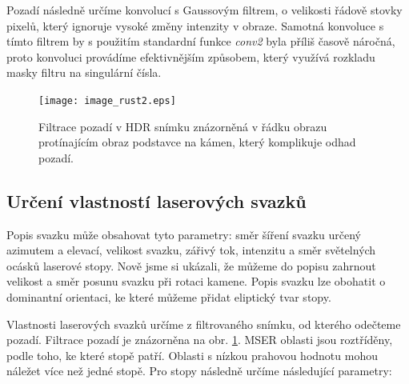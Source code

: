 	Pozadí následně určíme konvolucí s Gaussovým filtrem, o velikosti řádově stovky pixelů, který ignoruje vysoké změny intenzity v obraze. Samotná konvoluce s tímto filtrem by s použitím standardní funkce \textit{conv2} byla příliš časově náročná, proto konvoluci provádíme efektivnějším způsobem, který využívá rozkladu masky filtru na singulární čísla.
	
\begin{figure}[htbp]
    \centering\texttt{[image: image\_rust2.eps]}
     \caption[Filtrace pozadí.]{Filtrace pozadí v HDR snímku znázorněná v řádku obrazu protínajícím obraz podstavce na kámen, který komplikuje odhad pozadí.}
        \label{fig:pozadi}
\end{figure}
	       

\subsection*{Určení vlastností laserových svazků}
Popis svazku může obsahovat tyto parametry: směr šíření svazku určený azimutem a elevací, velikost svazku, zářivý tok, intenzitu a směr světelných ocásků laserové stopy. Nově jsme si ukázali, že můžeme do popisu zahrnout velikost a směr posunu svazku při rotaci kamene. Popis svazku lze obohatit o dominantní orientaci, ke které můžeme přidat eliptický tvar stopy. 

Vlastnosti laserových svazků určíme z filtrovaného snímku, od kterého odečteme pozadí. Filtrace pozadí je znázorněna na obr. \ref{fig:pozadi}. MSER oblasti jsou roztříděny, podle toho, ke které stopě patří. Oblasti s nízkou prahovou hodnotu mohou náležet více než jedné stopě. Pro stopy   následně určíme následující parametry:


